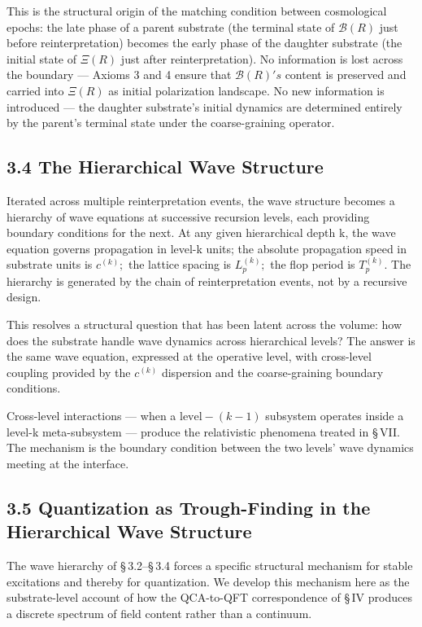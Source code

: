 \documentclass[11pt,oneside]{report}
\theoremstyle{definition}
\theoremstyle{remark}
\begin{document}
This is the structural origin of the matching condition between
cosmological epochs: the late phase of a parent substrate (the terminal
state of \ensuremath{\mathcal{B}(R)} just before reinterpretation) becomes the early phase of
the daughter substrate (the initial state of \ensuremath{\Xi (R)} just after
reinterpretation). No information is lost across the boundary --- Axioms
3 and 4 ensure that \ensuremath{\mathcal{B}(R)'s} content is preserved and carried into \ensuremath{\Xi (R)} as
initial polarization landscape. No new information is introduced --- the
daughter substrate's initial dynamics are determined entirely by the
parent's terminal state under the coarse-graining operator.

\subsection*{3.4 The Hierarchical Wave Structure}

Iterated across multiple reinterpretation events, the wave structure
becomes a hierarchy of wave equations at successive recursion levels,
each providing boundary conditions for the next. At any given
hierarchical depth k, the wave equation governs propagation in level-k
units; the absolute propagation speed in substrate units is \ensuremath{c^{(k)};}
the lattice spacing is \ensuremath{L_{p}^{(k)};} the flop period is \ensuremath{T_{p}^{(k)}.} The
hierarchy is generated by the chain of reinterpretation events, not by a
recursive design.

This resolves a structural question that has been latent across the
volume: how does the substrate handle wave dynamics across hierarchical
levels? The answer is the same wave equation, expressed at the operative
level, with cross-level coupling provided by the \ensuremath{c^{(k)}} dispersion and
the coarse-graining boundary conditions.

Cross-level interactions --- when a \ensuremath{\text{level}-(k-1)} subsystem operates
inside a level-k meta-subsystem --- produce the relativistic phenomena
treated in \S\,VII. The mechanism is the boundary condition between the two
levels' wave dynamics meeting at the interface.

\subsection*{3.5 Quantization as Trough-Finding in the Hierarchical Wave Structure}

The wave hierarchy of \S\,3.2--\S\,3.4 forces a specific structural mechanism
for stable excitations and thereby for quantization. We develop this
mechanism here as the substrate-level account of how the QCA-to-QFT
correspondence of \S\,IV produces a discrete spectrum of field content
rather than a continuum.
\end{document}
